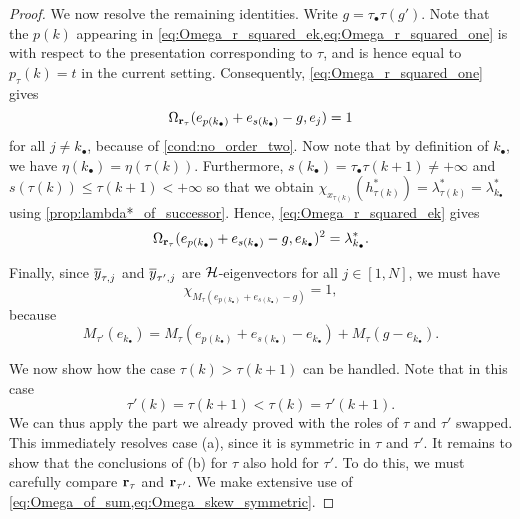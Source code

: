 \begin{proof}
	We now resolve the remaining identities. Write $g = \tau_\bullet \tau(g')$. Note that
	the $p(k)$ appearing in \cref{eq:Omega_r_squared_ek,eq:Omega_r_squared_one} is with
	respect to the presentation corresponding to $\tau$, and is hence equal to $p_\tau(k) =
		t$ in the current setting. Consequently, \cref{eq:Omega_r_squared_one} gives
	\begin{equation*}
		\Omega_{\mathbf{r}_\tau}(e_{p(k_\bullet)} + e_{s(k_\bullet)} -g, e_j) = 1
	\end{equation*}
	for all $j\neq k_\bullet$, because of \cref{cond:no_order_two}. Now note that by definition of $k_\bullet$,
	we have $\eta(k_\bullet) = \eta(\tau(k))$. Furthermore, $s(k_\bullet) =
		\tau_\bullet\tau(k+1) \neq + \infty$ and $s(\tau(k)) \leq \tau(k+1) < + \infty$ so that
	we obtain $\chi_{x_{\tau(k)}}(h^*_{\tau(k)}) = \lambda^*_{\tau(k)} =
		\lambda^*_{k_\bullet}$ using \cref{prop:lambda*_of_successor}. Hence, \cref{eq:Omega_r_squared_ek} gives
	\begin{equation*}
		\Omega_{\mathbf{r}_\tau}(e_{p(k_\bullet)} + e_{s(k_\bullet)} - g, e_{k_\bullet})^2 = \lambda_{k_\bullet}^*.
	\end{equation*}

	Finally, since $\overline{y}_{\tau, j}$ and $\overline{y}_{\tau', j}$ are $\mathcal{H}$-eigenvectors for all
	$j\in [1, N]$, we must have
	\begin{equation*}
		\chi_{M_\tau(e_{p(k_\bullet)} + e_{s(k_\bullet)} - g)} = 1,
	\end{equation*}
	because
	\begin{equation*}
		M_{\tau'}(e_{k_\bullet}) =
		M_\tau(e_{p(k_\bullet)} + e_{s(k_\bullet)} - e_{k_\bullet}) + M_\tau(g-e_{k_\bullet}).
	\end{equation*}

	\medskip

	We now show how the case $\tau(k) > \tau(k+1)$ can be handled. Note that in this case
	\begin{equation*}
		\tau'(k) = \tau(k+1) < \tau(k) = \tau'(k+1).
	\end{equation*}
	We can thus apply the part we already proved with the roles of $\tau$ and $\tau'$
	swapped. This immediately resolves case (a), since it is symmetric in $\tau$ and
	$\tau'$. It remains to show that the conclusions of (b) for $\tau$ also hold for
	$\tau'$. To do this, we must carefully compare $\mathbf{r}_\tau$ and $\mathbf{r}_{\tau'}$. We make
	extensive use of \cref{eq:Omega_of_sum,eq:Omega_skew_symmetric}.


\end{proof}
